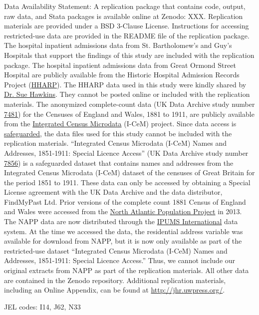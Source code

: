 \documentclass[12pt,english]{article}
\begin{document}
\begin{titlepage}
\begin{singlespace}
\noindent Data Availability Statement: A replication package that contains code, output, raw data, and Stata packages is available online at Zenodo: XXX. Replication materials are provided under a BSD 3-Clause License. Instructions for accessing restricted-use data are provided in the README file of the replication package. The hospital inpatient admissions data from St. Bartholomew's and Guy's Hospitals that support the findings of this study are included with the replication package. The hospital inpatient admissions data from Great Ormond Street Hospital are publicly available from the Historic Hospital Admission Records Project (\href{https://hharp.org/}{HHARP}). The HHARP data used in this study were kindly shared by \href{mailto:drsuehawkins@gmail.com}{Dr. Sue Hawkins}. They cannot be posted online or included with the replication materials. The anonymized complete-count data (UK Data Archive study number \href{https://beta.ukdataservice.ac.uk/datacatalogue/studies/study?id=7481#!/details}{7481}) for the Censuses of England and Wales, 1881 to 1911, are publicly available from the \href{https://icem.data-archive.ac.uk/#step1}{Integrated Census Microdata} (I-CeM) project. Since data access is \href{https://ukdataservice.ac.uk/find-data/access-conditions/}{safeguarded}, the data files used for this study cannot be included with the replication materials. ``Integrated Census Microdata (I-CeM) Names and Addresses, 1851-1911: Special Licence Access'' (UK Data Archive study number \href{https://beta.ukdataservice.ac.uk/datacatalogue/studies/study?id=7856#!/details}{7856}) is a safeguarded dataset that contains names and addresses from the Integrated Census Microdata (I-CeM) dataset of the censuses of Great Britain for the period 1851 to 1911. These data can only be accessed by obtaining a Special License agreement with the UK Data Archive and the data distributor, FindMyPast Ltd. Prior versions of the complete count 1881 Census of England and Wales were accessed from the \href{https://www.nappdata.org/napp/}{North Atlantic Population Project} in 2013. The NAPP data are now distributed through the \href{https://international.ipums.org/international/}{IPUMS International} data system. At the time we accessed the data, the residential address variable was available for download from NAPP, but it is now only available as part of the restricted-use dataset ``Integrated Census Microdata (I-CeM) Names and Addresses, 1851-1911: Special Licence Access.'' Thus, we cannot include our original extracts from NAPP as part of the replication materials. All other data are contained in the Zenodo repository. Additional replication materials, including an Online Appendix, can be found at \href{http://jhr.uwpress.org/}{http://jhr.uwpress.org/}.

\noindent JEL codes: I14, J62, N33

\end{singlespace}

\end{titlepage}
\setcounter{footnote}{0}
\end{document}
